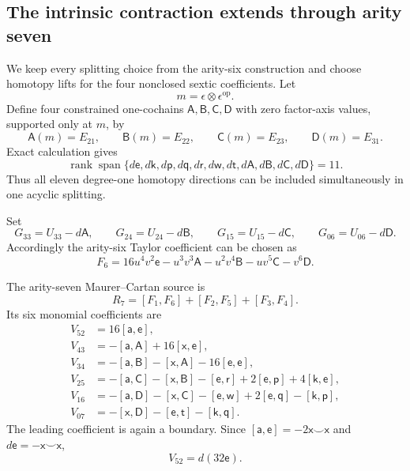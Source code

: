 \documentclass[11pt]{amsart}
\newcommand{\Span}{\operatorname{span}}
\newcommand{\rank}{\operatorname{rank}}
\begin{document}
\subsection{The intrinsic contraction extends through arity seven}\label{subsec:intrinsic-arity7}

We keep every splitting choice from the arity-six construction and choose homotopy lifts for the four nonclosed sextic coefficients.  Let
\[
m=\epsilon\otimes\epsilon^{\mathrm{op}}.
\]
Define four constrained one-cochains $\mathsf A,\mathsf B,\mathsf C,\mathsf D$ with zero factor-axis values, supported only at $m$, by
\[
\mathsf A(m)=E_{21},\qquad
\mathsf B(m)=E_{22},\qquad
\mathsf C(m)=E_{23},\qquad
\mathsf D(m)=E_{31}.
\]
Exact calculation gives
\begin{equation}\label{eq:arity7-degree1-rank}
\rank\Span\{d\mathsf e,d\mathsf k,d\mathsf p,d\mathsf q,d\mathsf r,d\mathsf w,d\mathsf t,
 d\mathsf A,d\mathsf B,d\mathsf C,d\mathsf D\}=11.
\end{equation}
Thus all eleven degree-one homotopy directions can be included simultaneously in one acyclic splitting.

Set
\begin{equation}\label{eq:arity7-sextic-complement}
G_{33}=U_{33}-d\mathsf A,\qquad
G_{24}=U_{24}-d\mathsf B,\qquad
G_{15}=U_{15}-d\mathsf C,\qquad
G_{06}=U_{06}-d\mathsf D.
\end{equation}
Accordingly the arity-six Taylor coefficient can be chosen as
\begin{equation}\label{eq:intrinsic-F6}
F_6
=
16u^4v^2\mathsf e
-u^3v^3\mathsf A
-u^2v^4\mathsf B
-uv^5\mathsf C
-v^6\mathsf D.
\end{equation}

The arity-seven Maurer--Cartan source is
\[
R_7=[F_1,F_6]+[F_2,F_5]+[F_3,F_4].
\]
Its six monomial coefficients are
\begin{align}
V_{52}&=16[\mathsf a,\mathsf e],\label{eq:arity7-V52}\\
V_{43}&=-[\mathsf a,\mathsf A]+16[\mathsf x,\mathsf e],\label{eq:arity7-V43}\\
V_{34}&=-[\mathsf a,\mathsf B]-[\mathsf x,\mathsf A]-16[\mathsf e,\mathsf e],\label{eq:arity7-V34}\\
V_{25}&=-[\mathsf a,\mathsf C]-[\mathsf x,\mathsf B]-[\mathsf e,\mathsf r]
+2[\mathsf e,\mathsf p]+4[\mathsf k,\mathsf e],\label{eq:arity7-V25}\\
V_{16}&=-[\mathsf a,\mathsf D]-[\mathsf x,\mathsf C]-[\mathsf e,\mathsf w]
+2[\mathsf e,\mathsf q]-[\mathsf k,\mathsf p],\label{eq:arity7-V16}\\
V_{07}&=-[\mathsf x,\mathsf D]-[\mathsf e,\mathsf t]-[\mathsf k,\mathsf q].\label{eq:arity7-V07}
\end{align}
The leading coefficient is again a boundary.  Since $[\mathsf a,\mathsf e]=-2\mathsf x\smile\mathsf x$ and $d\mathsf e=-\mathsf x\smile\mathsf x$,
\begin{equation}\label{eq:arity7-V52-boundary}
V_{52}=d(32\mathsf e).
\end{equation}
\end{document}
